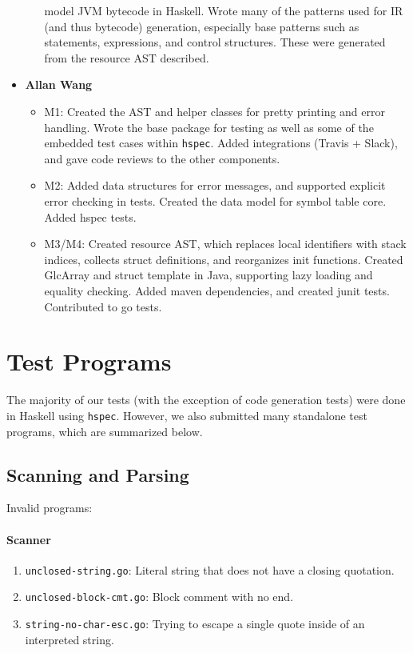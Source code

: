 \documentclass[11pt]{article}
\begin{document}
\begin{itemize}
\begin{itemize}
    model JVM bytecode in Haskell. Wrote many of the patterns used for
    IR (and thus bytecode) generation, especially base patterns such
    as statements, expressions, and control structures. These were
    generated from the resource AST described.
  \end{itemize}
\item \textbf{Allan Wang}
  \begin{itemize}
  \item M1: Created the AST and helper classes for pretty printing and
    error handling.  Wrote the base package for testing as well as
    some of the embedded test cases within \texttt{hspec}.  Added
    integrations (Travis + Slack), and gave code reviews to the other
    components.
  \item M2: Added data structures for error messages, and supported
    explicit error checking in tests. Created the data model for
    symbol table core. Added hspec tests.
  \item M3/M4: Created resource AST, which replaces local identifiers
    with stack indices, collects struct definitions, and reorganizes
    init functions. Created GlcArray and struct template in Java,
    supporting lazy loading and equality checking. Added maven
    dependencies, and created junit tests. Contributed to go tests.
  \end{itemize}
\end{itemize}

\newpage

 

\newpage
\appendix
\section{Test Programs}
\label{sec:appendixa}

The majority of our tests (with the exception of code generation
tests) were done in Haskell using \texttt{hspec}. However, we also
submitted many standalone test programs, which are summarized below.

\subsection{Scanning and Parsing}

Invalid programs:
\paragraph{Scanner}
\begin{enumerate}
\item \texttt{unclosed-string.go}: Literal string that does not have a
  closing quotation.
\item \texttt{unclosed-block-cmt.go}: Block comment with no end.
\item \texttt{string-no-char-esc.go}: Trying to escape a single quote
  inside of an interpreted string.
\end{enumerate}
\end{document}
